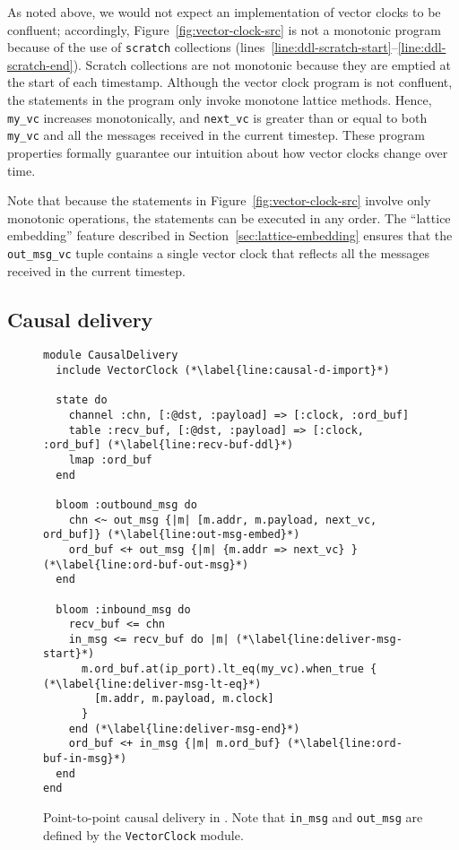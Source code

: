 As noted above, we would not expect an implementation of vector clocks to be
confluent; accordingly, Figure~\ref{fig:vector-clock-src} is not a monotonic
\lang program because of the use of \texttt{scratch} collections
(lines~\ref{line:ddl-scratch-start}--\ref{line:ddl-scratch-end}). Scratch
collections are not monotonic because they are emptied at the start of each
timestamp. Although the vector clock program is not confluent, the statements in
the program only invoke monotone lattice methods. Hence, \texttt{my\_vc}
increases monotonically, and \texttt{next\_vc} is greater than or equal to both
\texttt{my\_vc} and all the messages received in the current timestep. These
program properties formally guarantee our intuition about how vector clocks
change over time.

Note that because the statements in Figure~\ref{fig:vector-clock-src} involve
only monotonic operations, the statements can be executed in any order. The
``lattice embedding'' feature described in Section~\ref{sec:lattice-embedding}
ensures that the \texttt{out\_msg\_vc} tuple contains a single vector clock that
reflects all the messages received in the current timestep.


\subsection{Causal delivery}
\begin{figure}[t]
\begin{scriptsize}
\begin{lstlisting}
module CausalDelivery
  include VectorClock (*\label{line:causal-d-import}*)

  state do
    channel :chn, [:@dst, :payload] => [:clock, :ord_buf]
    table :recv_buf, [:@dst, :payload] => [:clock, :ord_buf] (*\label{line:recv-buf-ddl}*)
    lmap :ord_buf
  end

  bloom :outbound_msg do
    chn <~ out_msg {|m| [m.addr, m.payload, next_vc, ord_buf]} (*\label{line:out-msg-embed}*)
    ord_buf <+ out_msg {|m| {m.addr => next_vc} } (*\label{line:ord-buf-out-msg}*)
  end

  bloom :inbound_msg do
    recv_buf <= chn
    in_msg <= recv_buf do |m| (*\label{line:deliver-msg-start}*)
      m.ord_buf.at(ip_port).lt_eq(my_vc).when_true { (*\label{line:deliver-msg-lt-eq}*)
        [m.addr, m.payload, m.clock]
      }
    end (*\label{line:deliver-msg-end}*)
    ord_buf <+ in_msg {|m| m.ord_buf} (*\label{line:ord-buf-in-msg}*)
  end
end
\end{lstlisting}
\end{scriptsize}
\caption{Point-to-point causal delivery in \lang. Note that \texttt{in\_msg} and
\texttt{out\_msg} are defined by the \texttt{VectorClock} module.}
\label{fig:causal-delivery-src}
\end{figure}

